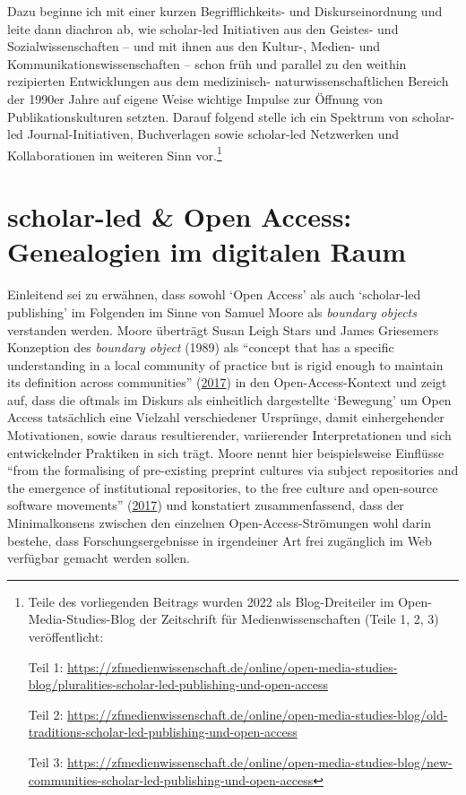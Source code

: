 \documentclass[a4paper,
fontsize=11pt,
oneside,
numbers=noperiodatend,
parskip=half-,
bibliography=totoc,
final
]{scrartcl}
\begin{document}
Dazu beginne ich mit einer kurzen Begrifflichkeits- und
Diskurseinordnung und leite dann diachron ab, wie scholar-led
Initiativen aus den Geistes- und Sozialwissenschaften -- und mit ihnen
aus den Kultur-, Medien- und Kommunikationswissenschaften -- schon früh
und parallel zu den weithin rezipierten Entwicklungen aus dem
medizinisch- naturwissenschaftlichen Bereich der 1990er Jahre auf eigene
Weise wichtige Impulse zur Öffnung von Publikationskulturen setzten.
Darauf folgend stelle ich ein Spektrum von scholar-led
Journal-Initiativen, Buchverlagen sowie scholar-led Netzwerken und
Kollaborationen im weiteren Sinn vor.\footnote{Teile des vorliegenden
  Beitrags wurden 2022 als Blog-Dreiteiler im Open-Media-Studies-Blog
  der Zeitschrift für Medienwissenschaften (Teile 1, 2, 3)
  veröffentlicht:

  Teil 1:
  \url{https://zfmedienwissenschaft.de/online/open-media-studies-blog/pluralities-scholar-led-publishing-und-open-access}

  Teil 2:
  \url{https://zfmedienwissenschaft.de/online/open-media-studies-blog/old-traditions-scholar-led-publishing-und-open-access}

  Teil 3:
  \url{https://zfmedienwissenschaft.de/online/open-media-studies-blog/new-communities-scholar-led-publishing-und-open-access}}

\hypertarget{scholar-led-open-access-genealogien-im-digitalen-raum}{%
\section{scholar-led \& Open Access: Genealogien im digitalen
Raum}\label{scholar-led-open-access-genealogien-im-digitalen-raum}}

Einleitend sei zu erwähnen, dass sowohl \enquote*{Open Access} als auch
\enquote*{scholar-led publishing} im Folgenden im Sinne von Samuel Moore
als \emph{boundary objects} verstanden werden. Moore überträgt Susan
Leigh Stars und James Griesemers Konzeption des \emph{boundary object}
(1989) als \enquote{concept that has a specific understanding in a local
community of practice but is rigid enough to maintain its definition
across communities} (\href{https://doi.org/10.4000/rfsic.3220}{2017}) in
den Open-Access-Kontext und zeigt auf, dass die oftmals im Diskurs als
einheitlich dargestellte \enquote*{Bewegung} um Open Access tatsächlich
eine Vielzahl verschiedener Ursprünge, damit einhergehender
Motivationen, sowie daraus resultierender, variierender Interpretationen
und sich entwickelnder Praktiken in sich trägt. Moore nennt hier
beispielsweise Einflüsse \enquote{from the formalising of pre-existing
preprint cultures via subject repositories and the emergence of
institutional repositories, to the free culture and open-source software
movements} (\href{http://journals.openedition.org/rfsic/3220}{2017}) und
konstatiert zusammenfassend, dass der Minimalkonsens zwischen den
einzelnen Open-Access-Strömungen wohl darin bestehe, dass
Forschungsergebnisse in irgendeiner Art frei zugänglich im Web verfügbar
gemacht werden sollen.
\end{document}
